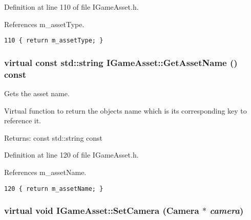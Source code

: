 Definition at line 110 of file IGameAsset.h.

References m\_\-assetType.

\begin{Code}\begin{verbatim}110 { return m_assetType; }
\end{verbatim}
\end{Code}


\hypertarget{class_i_game_asset_1ebad4f0cd4687fa4fe14aecf82edb9c}{
\subsubsection[GetAssetName]{\setlength{\rightskip}{0pt plus 5cm}virtual const std::string IGameAsset::GetAssetName () const}}
\label{class_i_game_asset_1ebad4f0cd4687fa4fe14aecf82edb9c}


Gets the asset name. 

Virtual function to return the objects name which is its corresponding key to reference it.

\begin{Desc}
\item[Returns:]const std::string const \end{Desc}


Definition at line 120 of file IGameAsset.h.

References m\_\-assetName.

\begin{Code}\begin{verbatim}120 { return m_assetName; }
\end{verbatim}
\end{Code}


\hypertarget{class_i_game_asset_152b3c23cfc77ba25c473f78e1987fc5}{
\subsubsection[SetCamera]{\setlength{\rightskip}{0pt plus 5cm}virtual void IGameAsset::SetCamera ({\bf Camera} $\ast$ {\em camera})}}
\label{class_i_game_asset_152b3c23cfc77ba25c473f78e1987fc5}



